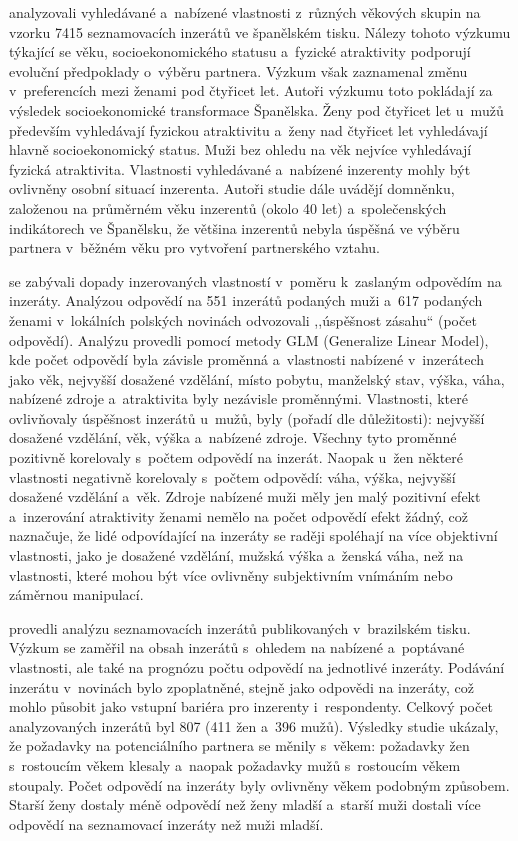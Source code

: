 \documentclass[a4paper, 12pt, notitlepage, oneside, numbers=noenddot]{report}
\begin{document}
\citet{Gil-BurmanPelaezSanchez2002} analyzovali vyhledávané a~nabízené
vlastnosti z~různých věkových skupin na vzorku 7415 seznamovacích
inzerátů ve španělském tisku. Nálezy tohoto výzkumu týkající se věku,
socioekonomického statusu a~fyzické atraktivity podporují evoluční
předpoklady o~výběru partnera. Výzkum však zaznamenal změnu
v~pre\-fe\-ren\-cích mezi ženami pod čtyřicet let. Autoři výzkumu toto
pokládají za výsledek so\-cio\-eko\-no\-mické transformace
Španělska. Ženy pod čtyřicet let u~mužů především vyhledávají fyzickou
atraktivitu a~ženy nad čtyřicet let vyhledávají hlavně socioekonomický
status. Muži bez ohledu na věk nejvíce vyhledávají fyzická
atraktivita.  Vlastnosti vyhledávané a~nabízené inzerenty mohly být
ovlivněny osobní situací inzerenta. Autoři studie dále uvádějí
domněnku, založenou na průměrném věku inzerentů (okolo 40 let)
a~společenských indikátorech ve Španělsku, že většina inzerentů nebyla
úspěšná ve výběru partnera v~běžném věku pro vytvoření partnerského
vztahu.

\citet{PawlowskiKoziel2002} se zabývali dopady inzerovaných vlastností
v~poměru k~zaslaným odpovědím na inzeráty.  Analýzou odpovědí na 551
inzerátů podaných muži a~617 podaných ženami v~lokálních polských
novinách odvozovali ,,úspěšnost zásahu`` (počet odpovědí). Analýzu
provedli pomocí metody GLM (Generalize Linear Model), kde počet
odpovědí byla závisle proměnná a~vlastnosti nabízené v~inzerátech jako
věk, nejvyšší dosažené vzdělání, místo pobytu, manželský stav, výška,
váha, nabízené zdroje a~atraktivita byly nezávisle proměnnými.
Vlastnosti, které ovlivňovaly úspěšnost inzerátů u~mužů, byly (pořadí
dle důležitosti): nejvyšší dosažené vzdělání, věk, výška a~nabízené
zdroje. Všechny tyto proměnné pozitivně korelovaly s~počtem odpovědí
na inzerát. Naopak u~žen některé vlastnosti negativně korelovaly
s~počtem odpovědí: váha, výška, nejvyšší dosažené vzdělání
a~věk. Zdroje nabízené muži měly jen malý pozitivní efekt a~inzerování
atraktivity ženami nemělo na počet odpovědí efekt žádný, což
naznačuje, že lidé odpovídající na inzeráty se raději spoléhají na
více objektivní vlastnosti, jako je dosažené vzdělání, mužská výška
a~ženská váha, než na vlastnosti, které mohou být více ovlivněny
subjektivním vnímáním nebo záměrnou manipulací.

 provedli analýzu seznamovacích inzerátů
publikovaných v~brazilském tisku.  Výzkum se zaměřil na obsah
inzerátů s~ohledem na nabízené a~poptávané vlastnosti, ale také na
prognózu počtu odpovědí na jednotlivé inzeráty.  Podávání inzerátu
v~novinách bylo zpoplatněné, stejně jako odpovědi na inzeráty, což
mohlo působit jako vstupní bariéra pro inzerenty i~respondenty.
Celkový počet analyzovaných inzerátů byl 807 (411 žen a~396 mužů).
Výsledky studie ukázaly, že požadavky na potenciálního partnera se
měnily s~věkem: požadavky žen s~rostoucím věkem klesaly a~naopak
požadavky mužů s~rostoucím věkem stoupaly.  Počet odpovědí na inzeráty
byly ovlivněny věkem podobným způsobem.  Starší ženy dostaly méně
odpovědí než ženy mladší a~starší muži dostali více odpovědí na
seznamovací inzeráty než muži mladší.
\end{document}
